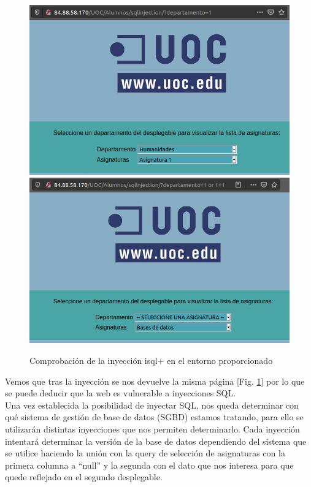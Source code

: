 \documentclass[a4paper,oneside]{article}
\begin{document}
\begin{figure}[h!]
  \centering
  \includegraphics[scale=0.5]{images/normal.png}\\
  \vspace{.5cm}
  \includegraphics[scale=0.5]{images/isql+.png}
  \caption{Comprobación de la inyección isql+ en el entorno proporcionado}
  \label{fig:isql}
\end{figure}

Vemos que tras la inyección se nos devuelve la misma página [Fig. \ref{fig:isql}] por lo que se puede deducir que la web es vulnerable a inyecciones SQL.\\

Una vez establecida la posibilidad de inyectar SQL, nos queda determinar con qué sistema de gestión de base de datos (SGBD) estamos tratando, para ello se utilizarán distintas inyecciones que nos permiten determinarlo. Cada inyección intentará determinar la versión de la base de datos dependiendo del sistema que se utilice haciendo la unión con la query de selección de asignaturas con la primera columna a ``null'' y la segunda con el dato que nos interesa para que quede reflejado en el segundo desplegable.\\
\end{document}
